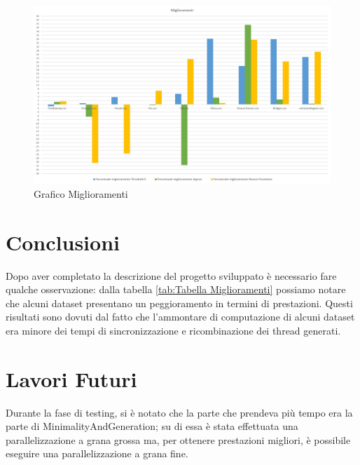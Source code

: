 \begin{figure}[H]
	\centering
	\includegraphics[scale=0.43]{Immagini/GraficoMiglioramenti.jpg}
	\caption{Grafico Miglioramenti}
	\label{fig:Grafico Miglioramenti}
\end{figure}

\section{Conclusioni}
Dopo aver completato la descrizione del progetto sviluppato è necessario fare qualche osservazione:  dalla tabella \ref{tab:Tabella Miglioramenti} possiamo notare che alcuni dataset presentano un peggioramento in termini di prestazioni. Questi risultati sono dovuti dal fatto che l'ammontare di computazione di alcuni dataset era minore dei tempi di sincronizzazione e ricombinazione dei thread generati.
\section{Lavori Futuri}
Durante la fase di testing, si è notato che la parte che prendeva più tempo era la parte di MinimalityAndGeneration; su di essa è stata effettuata una parallelizzazione a grana grossa ma, per ottenere prestazioni migliori, è possibile eseguire una parallelizzazione a grana fine.
